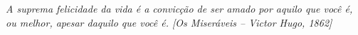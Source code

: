 \begin{epigrafe}
    \vspace*{\fill}
	\begin{flushright}
		\textit{A suprema felicidade da vida é a convicção de ser amado por aquilo que você é, ou melhor, apesar daquilo que você é.
		[Os Miseráveis – Victor Hugo, 1862]
		}
	\end{flushright}
\end{epigrafe}
